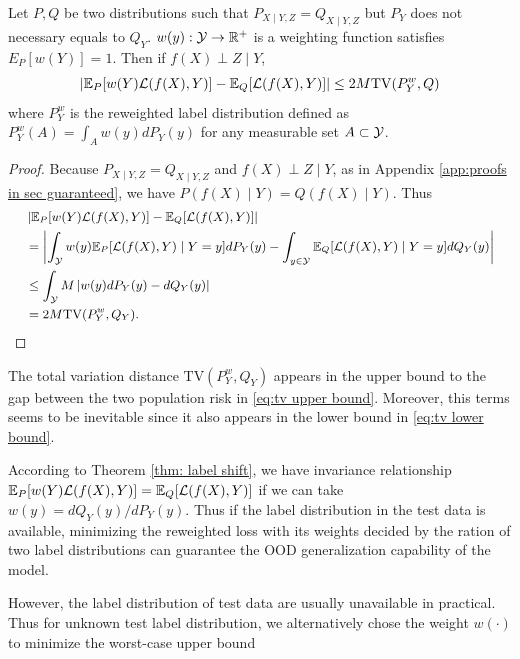\begin{theorem}\label{thm: label shift}
	Let $P, Q$ be two distributions such that $P_{X\mid Y, Z} = Q_{X\mid Y, Z}$ but $P_{Y}$ does not necessary equals to $Q_{Y}$. $w(y):\mathcal{Y}\rightarrow\mathbb{R}^{+}$ is a weighting function satisfies $E_{P}[w(Y)] = 1$. Then if $f(X)\perp Z\mid Y$,
	\begin{equation}
		\small
		\left|\mE_{P}[w(Y)\cL(f(X),Y)] - \mE_{Q}[\cL(f(X),Y)]\right| \leq 2M \mathrm{TV}(P^{w}_{Y}, Q)
	\end{equation}
	where $P^{w}_{Y}$ is the reweighted label distribution defined as $P^{w}_{Y}(A) = \int_{A}w(y)dP_{Y}(y)$ for any measurable set $A\subset\mathcal{Y}$. 
\end{theorem}
\begin{proof}
	Because $P_{X\mid Y, Z} = Q_{X\mid Y, Z}$ and $f(X)\perp Z\mid Y$, as in Appendix \ref{app:proofs in sec guaranteed}, we have $P(f(X)\mid Y) = Q(f(X)\mid Y)$. Thus 
	\begin{equation}\label{eq:tv upper bound}
		\small
		\begin{aligned}
			& \left|\mE_{P}[w(Y)\cL(f(X),Y)] - \mE_{Q}[\cL(f(X),Y)]\right| \\
			& = \left|\int_{\cY} w(y)\mE_{P}[\cL(f(X),Y)\mid Y=y]dP_{Y}(y) - \int_{y\in \cY}\mE_{Q}[\cL(f(X),Y)\mid Y=y] dQ_{Y}(y)\right| \\ 
			& \leq \int_{\cY}  M\left|w(y)dP_{Y}(y) - dQ_{Y}(y)\right| \\
			& = 2M \mathrm{TV}(P^{w}_{Y}, Q_{Y}).
		\end{aligned}
	\end{equation}
\end{proof}
\begin{remark}
	The total variation distance $\mathrm{TV}(P^{w}_{Y}, Q_{Y})$ appears in the upper bound to the gap between the two population risk in \eqref{eq:tv upper bound}. Moreover, this terms seems to be inevitable since it also appears in the lower bound in \eqref{eq:tv lower bound}. 
\end{remark}
According to Theorem \ref{thm: label shift}, we have invariance relationship $\mathbb{E}_{P}[w(Y)\mathcal{L}(f(X),Y)] = \mathbb{E}_{Q}[\mathcal{L}(f(X),Y)]$ if we can take $w(y) = dQ_{Y}(y) / dP_{Y}(y)$. Thus if the label distribution in the test data is available, minimizing the reweighted loss with its weights decided by the ration of two label distributions can guarantee the OOD generalization capability of the model. 
\par
However, the label distribution of test data are usually unavailable in practical. Thus for unknown test label distribution, we alternatively chose the weight $w(\cdot)$ to minimize the worst-case upper bound 
